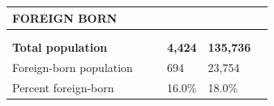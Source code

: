 \documentclass[9pt]{report}
\begin{document}
\newpage
\setlength{\tabcolsep}{.01in} %
\begin{tabular}{p{.10in}p{.10in}p{.10in}p{3.7in}>{\hfill}p{.85in}>{\hfill}p{.85in}>{\hfill}p{.85in}>{\hfill}p{.85in}p{0.1in}}
\multicolumn{9}{l}{\parbox{7.1in}{\raggedright{\large{\strut\textbf{FOREIGN BORN}\strut}}}} \\ 
\hline
\multicolumn{4}{l}{\parbox{3.5in}{\raggedright{\textbf{}}}} & \multicolumn{1}{r}{\parbox{.85in}{\strut\raggedleft{\textbf{}\strut}}} & \multicolumn{1}{r}{\parbox{.85in}{\strut\raggedleft{\textbf{}\strut}}} & \multicolumn{1}{r}{\parbox{.85in}{\strut{}}} & \multicolumn{1}{r}{\parbox{.85in}{\strut{}}} & \\ 
\multicolumn{9}{l}{} \\ 
\multicolumn{4}{l}{\parbox{3.5in}{\strut\raggedright{\textbf{Total population}\strut}}} & \textbf{} & \textbf{} & \textbf{4,424} & \textbf{135,736} & \textbf{} \\ 
\multicolumn{4}{l}{\parbox{3.6in}{\strut\raggedright{{Foreign-born population}}\strut}} &  &  & 694 & 23,754 & \multicolumn{1}{l}{}  \\ 
\multicolumn{4}{l}{\parbox{3.6in}{\strut\raggedright{{Percent foreign-born}}\strut}} &  &  & 16.0\% & 18.0\% & \multicolumn{1}{l}{}  \\ 

\end{tabular}
\setlength{\tabcolsep}{6pt} %
\end{document}
